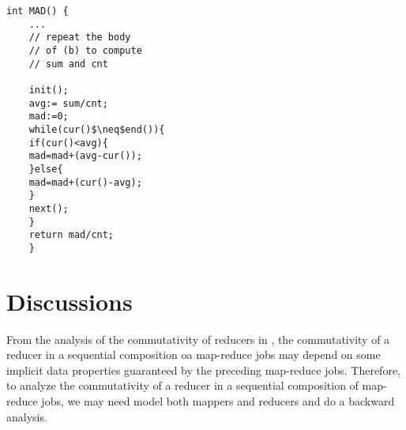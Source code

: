 \documentclass[runningheads,a4paper]{llncs}
\begin{document}
	\begin{lstlisting}[mathescape=true]
	int MAD() {
	...
	// repeat the body  
	// of (b) to compute
	// sum and cnt
	
	init();
	avg:= sum/cnt;
	mad:=0;
	while(cur()$\neq$end()){
	if(cur()<avg){
	mad=mad+(avg-cur());
	}else{
	mad=mad+(cur()-avg);
	}
	next();
	}
	return mad/cnt;
	}
	\end{lstlisting}
	
\section{Discussions}

From the analysis of the commutativity of reducers in \cite{XZZ+14}, the commutativity of a reducer in a sequential composition oa map-reduce jobs may depend on some implicit data properties guaranteed by the preceding map-reduce jobs. Therefore, to analyze the commutativity of a reducer in a sequential composition of map-reduce jobs, we may need model both mappers and reducers and do a backward analysis.





\newpage
\end{document}
